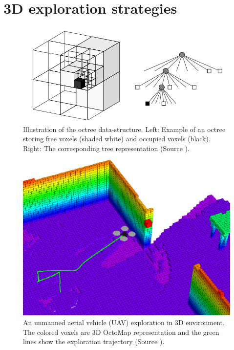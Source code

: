 \section{3D exploration strategies}

\begin{figure}[t!]
	\centering
	\includegraphics[width=1.0\columnwidth]{./pictures/octomap.png}	
	\caption{Illustration of the octree data-structure. Left: Example of an octree storing free voxels (shaded white) and occupied voxels (black). Right: The corresponding tree representation (Source \cite{Wurm2012}).}
	\label{fig:octomap}
\end{figure}

\begin{figure}[t!]
	\centering
	\includegraphics[width=1.0\columnwidth]{./pictures/octomap_and_drone.png}	
	\caption{An unmanned aerial vehicle (UAV) exploration in 3D environment. The colored voxels are 3D OctoMap representation and the green lines show the exploration trajectory (Source \cite{Wang2019}).}
	\label{fig:octomapanddrone}
\end{figure}


